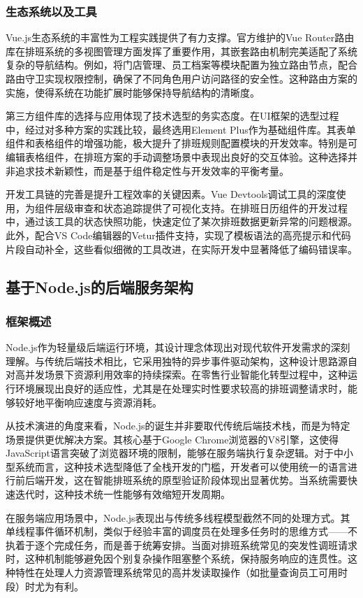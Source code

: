 \documentclass{ctexart}
\begin{document}
\subsubsection{生态系统以及工具}

Vue.js生态系统的丰富性为工程实践提供了有力支撑。官方维护的Vue Router路由库在排班系统的多视图管理方面发挥了重要作用，其嵌套路由机制完美适配了系统复杂的导航结构。例如，将门店管理、员工档案等模块配置为独立路由节点，配合路由守卫实现权限控制，确保了不同角色用户访问路径的安全性。这种路由方案的实施，使得系统在功能扩展时能够保持导航结构的清晰度。

第三方组件库的选择与应用体现了技术选型的务实态度。在UI框架的选型过程中，经过对多种方案的实践比较，最终选用Element Plus作为基础组件库。其表单组件和表格组件的增强功能，极大提升了排班规则配置模块的开发效率。特别是可编辑表格组件，在排班方案的手动调整场景中表现出良好的交互体验。这种选择并非追求技术新颖性，而是基于组件稳定性与开发效率的平衡考量。

开发工具链的完善是提升工程效率的关键因素。Vue Devtools调试工具的深度使用，为组件层级审查和状态追踪提供了可视化支持。在排班日历组件的开发过程中，通过该工具的状态快照功能，快速定位了某次排班数据更新异常的问题根源。此外，配合VS Code编辑器的Vetur插件支持，实现了模板语法的高亮提示和代码片段自动补全，这些看似细微的工具改进，在实际开发中显著降低了编码错误率。


\subsection{基于Node.js的后端服务架构}
\subsubsection{框架概述}
Node.js作为轻量级后端运行环境，其设计理念体现出对现代软件开发需求的深刻理解。与传统后端技术相比，它采用独特的异步事件驱动架构，这种设计思路源自对高并发场景下资源利用效率的持续探索。在零售行业智能化转型过程中，这种运行环境展现出良好的适应性，尤其是在处理实时性要求较高的排班调整请求时，能够较好地平衡响应速度与资源消耗。

从技术演进的角度来看，Node.js的诞生并非要取代传统后端技术栈，而是为特定场景提供更优解决方案。其核心基于Google Chrome浏览器的V8引擎，这使得JavaScript语言突破了浏览器环境的限制，能够在服务端执行复杂逻辑。对于中小型系统而言，这种技术选型降低了全栈开发的门槛，开发者可以使用统一的语言进行前后端开发，这在智能排班系统的原型验证阶段体现出显著优势。当系统需要快速迭代时，这种技术统一性能够有效缩短开发周期。

在服务端应用场景中，Node.js表现出与传统多线程模型截然不同的处理方式。其单线程事件循环机制，类似于经验丰富的调度员在处理多任务时的思维方式——不执着于逐个完成任务，而是善于统筹安排。当面对排班系统常见的突发性调班请求时，这种机制能够避免因个别复杂操作阻塞整个系统，保持服务响应的连贯性。这种特性在处理人力资源管理系统常见的高并发读取操作（如批量查询员工可用时段）时尤为有利。
\end{document}
